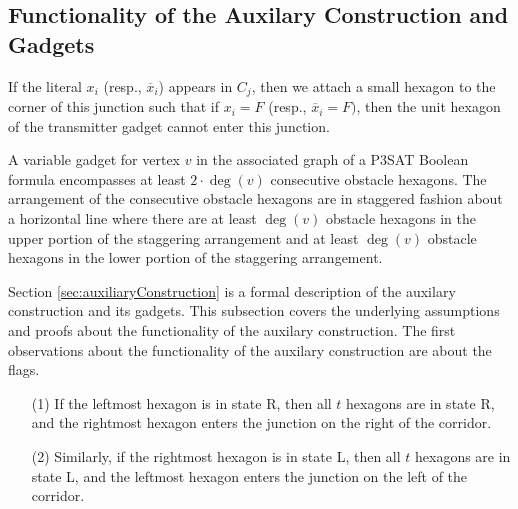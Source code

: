 \subsection{Functionality of the Auxilary Construction and Gadgets}

If the literal $x_i$ (resp., $\overline{x}_i$) appears in $C_j$, then we attach a small hexagon to the corner of this junction such that if $x_i=F$ (resp., $\overline{x}_i=F)$, then the unit hexagon of the transmitter gadget cannot enter this junction. 

A variable gadget for vertex $v$ in the associated graph of a P3SAT Boolean formula encompasses at least $2 \cdot \deg (v)$ consecutive obstacle hexagons. 
The arrangement of the consecutive obstacle hexagons are in staggered fashion about a horizontal line where there are at least $\deg (v)$ obstacle hexagons in the upper portion of the staggering arrangement and at least $\deg (v)$ obstacle hexagons in the lower portion of the staggering arrangement.

Section \ref{sec:auxiliaryConstruction} is a formal description of the auxilary construction and its gadgets.
This subsection covers the underlying assumptions and proofs about the functionality of the auxilary construction.
The first observations about the functionality of the auxilary construction are about the flags.
\begin{observation}\label{obs:corridor}

\begin{itemize}

\item[(1)] If the leftmost hexagon is in state R, then all $t$ hexagons are in state R, and the rightmost hexagon enters the junction on the right of the corridor.
\item[(2)] Similarly, if the rightmost hexagon is in state L, then all $t$ hexagons are in state L, and the leftmost hexagon enters the junction on the left of the corridor.
\end{itemize}
\end{observation}

